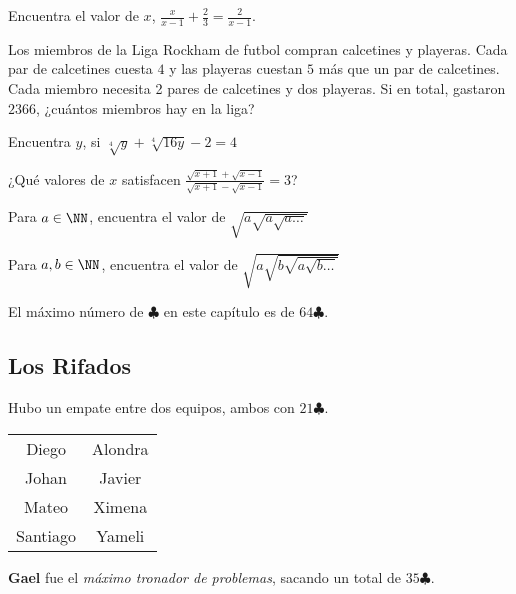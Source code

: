 \begin{problem}[$3 \clubsuit$]
    Encuentra el valor de $x$, $\frac{x}{x-1}+\frac{2}{3} = 
    \frac{2}{x-1}$.
\end{problem}

\begin{problem}
    Los miembros de la Liga Rockham de futbol compran calcetines 
    y playeras. Cada par de calcetines cuesta $4$ y las playeras 
    cuestan $5$ más que un par de calcetines. Cada miembro 
    necesita 2 pares de calcetines y dos playeras. Si en total, 
    gastaron $2366$, ¿cuántos miembros hay en la liga?
\end{problem}

\begin{problem}[$4 \clubsuit$]
    Encuentra $y$, si $\sqrt[4]{y}+\sqrt[4]{16y}-2=4$
\end{problem}

\begin{problem}
    ¿Qué valores de $x$ satisfacen 
    $\frac{\sqrt{x+1}+\sqrt{x-1}}{\sqrt{x+1}-\sqrt{x-1}}=3$?
\end{problem}

\begin{sproblem}[$7 \clubsuit$]
    \jp

    Para $a \in \NN$, encuentra el valor de 
    $\sqrt{a\sqrt{a\sqrt{a\dots}}}$
\end{sproblem}

\begin{sproblem}[$7 \clubsuit$]
    \jp

    Para $a,b \in \NN$, encuentra el valor de 
    $\sqrt{a\sqrt{b\sqrt{a\sqrt{b\dots}}}}$
\end{sproblem}

\noindent El máximo número de $\clubsuit$ en este capítulo es de $64 \clubsuit$.

\subsection{Los Rifados}



Hubo un empate entre dos equipos, ambos con $21 \clubsuit$.

\vspace{3mm}

\begin{center}
    \begin{tabular}{|c|c|}
        \hline
        Diego & Alondra \\
        Johan & Javier \\
        Mateo & Ximena \\
        Santiago & Yameli \\
        \hline
    \end{tabular}
\end{center}

\vspace{3mm}

\begin{moral}
    \textbf{Gael} fue el \textit{máximo tronador de problemas}, 
    sacando un total de $35 \clubsuit$.
\end{moral}
